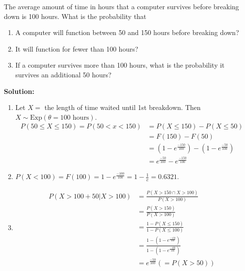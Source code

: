 \begin{example}
    The average amount of time in hours that a computer survives before breaking down is 100 hours. What is the probability that
    \begin{enumerate}[label=(\alph*)]
        \item A computer will function between 50 and 150 hours before breaking down?
        \item It will function for fewer than 100 hours?
        \item If a computer survives more than 100 hours, what is the probability it survives an additional 50 hours?
    \end{enumerate}

    \pagebreak

    \textbf{Solution:}
    \begin{enumerate}[label=(\alph*)]
        \item Let $X =$ the length of time waited until 1st breakdown. Then $X \sim \text{Exp}(\theta = 100 \text{ hours})$. \vspace{-2mm}
        \begin{align*}
            P(50 \leq X \leq 150) = P(50 < x < 150) &= P(X \leq 150) - P(X \leq 50) \\
            &= F(150) - F(50) \\
            &= \left( 1 - e^{\frac{-150}{100}} \right) - \left( 1 - e^{\frac{-50}{100}} \right) \\
            &= e^{\frac{-50}{100}} - e^{\frac{-150}{100}}
        \end{align*}
        \item $P(X < 100) = F(100) = 1 - e^{\frac{-100}{100}} = 1 - \frac{1}{e} = 0.6321$. \\
        \item \phantom{A} \vspace{-3mm}
        \begin{align*}
            P(X > 100 + 50 | X > 100) &= \frac{P(X > 150 \cap X > 100)}{P(X > 100)} \\
            &= \frac{P(X > 150)}{P(X > 100)} \\
            &= \frac{1 - P(X \leq 150)}{1 - P(X \leq 100)} \\
            &= \frac{1 - \left( 1 - e^{\frac{-150}{100}} \right)}{1 - \left( 1 - e^{\frac{-100}{100}} \right)} \\
            &= e^{\frac{-50}{100}} \left( = P(X > 50) \right)
        \end{align*}
    \end{enumerate}
\end{example}

